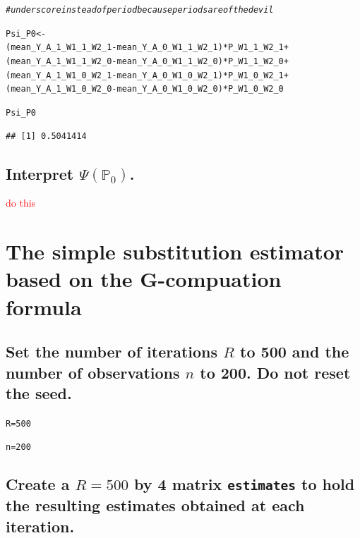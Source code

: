 \documentclass{article}\usepackage[]{graphicx}\usepackage[]{xcolor}
\makeatletter
\newcommand{\hlnum}[1]{\textcolor[rgb]{0.686,0.059,0.569}{#1}}%
\newcommand{\hlcom}[1]{\textcolor[rgb]{0.678,0.584,0.686}{\textit{#1}}}%
\newcommand{\hlopt}[1]{\textcolor[rgb]{0,0,0}{#1}}%
\newcommand{\hlstd}[1]{\textcolor[rgb]{0.345,0.345,0.345}{#1}}%
\newcommand{\hlkwb}[1]{\textcolor[rgb]{0.69,0.353,0.396}{#1}}%
\newenvironment{kframe}{%
 \def\at@end@of@kframe{}%
 \ifinner\ifhmode%
  \def\at@end@of@kframe{\end{minipage}}%
  \begin{minipage}{\columnwidth}%
 \fi\fi%
 \def\FrameCommand##1{\hskip\@totalleftmargin \hskip-\fboxsep
 \colorbox{shadecolor}{##1}\hskip-\fboxsep
     \hskip-\linewidth \hskip-\@totalleftmargin \hskip\columnwidth}%
 \MakeFramed {\advance\hsize-\width
   \@totalleftmargin\z@ \linewidth\hsize
   \@setminipage}}%
 {\par\unskip\endMakeFramed%
 \at@end@of@kframe}
\newenvironment{knitrout}{}{} %
\makeatother
\begin{document}
\begin{knitrout}
\begin{kframe}
\begin{alltt}
\hlcom{# underscore instead of period because periods are of the devil}

\hlstd{Psi_P0} \hlkwb{<-}
  \hlstd{(mean_Y_A_1_W1_1_W2_1} \hlopt{-} \hlstd{mean_Y_A_0_W1_1_W2_1)}\hlopt{*}\hlstd{P_W1_1_W2_1} \hlopt{+}
  \hlstd{(mean_Y_A_1_W1_1_W2_0} \hlopt{-} \hlstd{mean_Y_A_0_W1_1_W2_0)}\hlopt{*}\hlstd{P_W1_1_W2_0} \hlopt{+}
  \hlstd{(mean_Y_A_1_W1_0_W2_1} \hlopt{-} \hlstd{mean_Y_A_0_W1_0_W2_1)}\hlopt{*}\hlstd{P_W1_0_W2_1} \hlopt{+}
  \hlstd{(mean_Y_A_1_W1_0_W2_0} \hlopt{-} \hlstd{mean_Y_A_0_W1_0_W2_0)}\hlopt{*}\hlstd{P_W1_0_W2_0}

\hlstd{Psi_P0}
\end{alltt}
\begin{verbatim}
## [1] 0.5041414
\end{verbatim}
\end{kframe}
\end{knitrout}
  
  \subsection{Interpret $\Psi(\mathbb{P}_0)$.}
  
\textcolor{red}{do this}  





\section{The simple substitution estimator based on the G-compuation formula}

  \subsection{Set the number of iterations $R$ to 500 and the number of observations $n$ to 200. Do not reset the seed.}
  
\begin{knitrout}
\color{fgcolor}\begin{kframe}
\begin{alltt}
\hlstd{R} \hlkwb{=} \hlnum{500}

\hlstd{n} \hlkwb{=} \hlnum{200}
\end{alltt}
\end{kframe}
\end{knitrout}
  
  \subsection{Create a $R = 500$ by 4 matrix \texttt{estimates} to hold the resulting estimates obtained at each iteration.}
  
\end{document}
